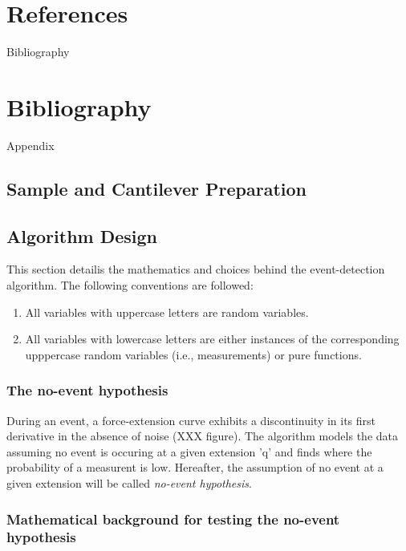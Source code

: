 \documentclass[%
  aip,12pt,tightenlines,
  amsthm,
 amsmath,amssymb
]{article}
\newcommand{\firstp}[0]{}
\begin{document}


\section{References}



\clearpage

Bibliography 

\section{Bibliography}

 


\clearpage

Appendix

\subsection{Sample and Cantilever Preparation}

\subsection{Algorithm Design}

This section detailis the mathematics and choices behind the event-detection algorithm. The following conventions are followed:

\begin{enumerate}
 \item All variables with uppercase letters are random variables.
 \item All variables with lowercase letters are either instances of the corresponding upppercase random variables (i.e., measurements) or pure functions. 
\end{enumerate}

\subsubsection{The no-event hypothesis}

\firstp During an event, a force-extension curve exhibits a discontinuity in its first derivative in the absence of noise (XXX figure). The algorithm models the data assuming no event is occuring at a given extension 'q' and finds where the probability of a measurent is low. Hereafter, the assumption of no event at a given extension will be called \emph{no-event hypothesis}. 

\subsubsection{Mathematical background for testing the no-event hypothesis}
\end{document}
